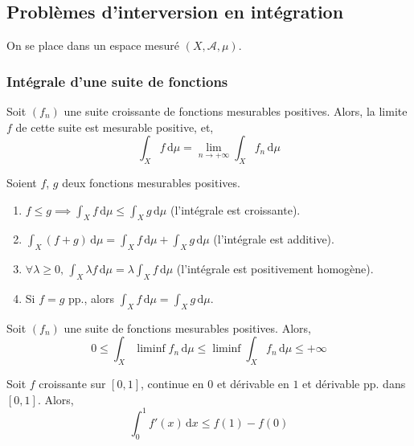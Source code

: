   \subsection{Problèmes d'interversion en intégration}

  On se place dans un espace mesuré $(X, \mathcal{A}, \mu)$.

  \subsubsection{Intégrale d'une suite de fonctions}


  \begin{theorem}
    Soit $(f_n)$ une suite croissante de fonctions mesurables positives. Alors, la limite $f$ de cette suite est mesurable positive, et,
    \[ \int_X f \, \mathrm{d}\mu = \lim_{n \rightarrow +\infty} \int_X f_n \, \mathrm{d}\mu \]
  \end{theorem}

  \begin{application}
    Soient $f$, $g$ deux fonctions mesurables positives.
    \begin{enumerate}[label={\bfseries(\roman*)}]
      \item $f \leq g \implies \int_X f \, \mathrm{d}\mu \leq \int_X g \, \mathrm{d}\mu$ (l'intégrale est croissante).
      \item $\int_X (f+g) \, \mathrm{d}\mu = \int_X f \, \mathrm{d}\mu + \int_X g \, \mathrm{d}\mu$ (l'intégrale est additive).
      \item $\forall \lambda \geq 0, \, \int_X \lambda f \, \mathrm{d}\mu = \lambda \int_X f \, \mathrm{d}\mu$ (l'intégrale est positivement homogène).
      \item Si $f = g$ pp., alors $\int_X f \, \mathrm{d}\mu = \int_X g \, \mathrm{d}\mu$.
    \end{enumerate}
  \end{application}


  \begin{theorem}
    Soit $(f_n)$ une suite de fonctions mesurables positives. Alors,
    \[ 0 \leq \int_X \liminf f_n \, \mathrm{d}\mu \leq \liminf \int_X f_n \, \mathrm{d}\mu \leq +\infty \]
  \end{theorem}

  \begin{example}
    \label{235-2}
    Soit $f$ croissante sur $[0,1]$, continue en $0$ et dérivable en $1$ et dérivable pp. dans $[0,1]$. Alors,
    \[ \int_{0}^{1} f'(x) \, \mathrm{d}x \leq f(1) - f(0) \]
  \end{example}

